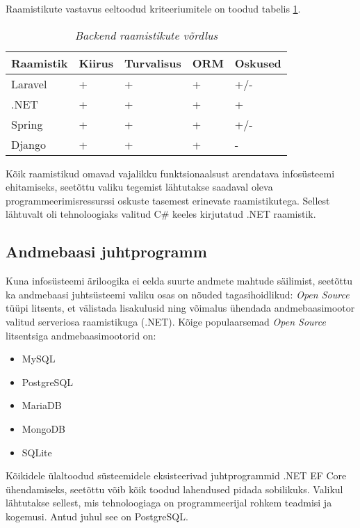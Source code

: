 Raamistikute vastavus eeltoodud kriteeriumitele on toodud tabelis \ref{tab:requirements}.
\begin{longtable}{|p{3cm}|p{2.5cm}|p{2.5cm}|p{2.5cm}|p{2.5cm}|}
	\caption{\it{Backend raamistikute võrdlus}}
	\label{tab:requirements}\\ \hline
	\textbf{Raamistik} &  \textbf{Kiirus} & \textbf{Turvalisus}  & \textbf{ORM} & \textbf{Oskused} \\
	\hline
	\endhead
	\endfoot
	\hline
	\endlastfoot
Laravel & + & + & + & +/-  \\ \hline
.NET    & + & + & + & +  \\ \hline
Spring  & + & + & + & +/-  \\ \hline
Django  & + & + & + & -  \\ \hline
\end{longtable}

Kõik raamistikud omavad vajalikku funktsionaalsust arendatava infosüsteemi ehitamiseks, seetõttu valiku tegemist 
lähtutakse saadaval oleva programmeerimisressurssi oskuste tasemest erinevate raamistikutega. Sellest lähtuvalt
oli tehnoloogiaks valitud C\# keeles kirjutatud .NET raamistik.

\subsection{Andmebaasi juhtprogramm}
\label{analysis_database_subsection}
Kuna infosüsteemi äriloogika ei eelda suurte andmete mahtude säilimist, seetõttu ka andmebaasi juhtsüsteemi 
valiku osas on nõuded tagasihoidlikud: \textit{Open Source} tüüpi litsents, et välistada lisakulusid ning
võimalus ühendada andmebaasimootor valitud serveriosa raamistikuga (.NET). Kõige populaarsemad 
\textit{Open Source} litsentsiga andmebaasimootorid on:
\begin{itemize}
    \item MySQL
    \item PostgreSQL
    \item MariaDB
    \item MongoDB
    \item SQLite
\end{itemize}
Kõikidele ülaltoodud süsteemidele eksisteerivad juhtprogrammid .NET EF Core ühendamiseks, seetõttu võib kõik
toodud lahendused pidada sobilikuks. Valikul lähtutakse sellest, mis tehnoloogiaga on programmeerijal  rohkem teadmisi 
ja kogemusi. Antud juhul see on PostgreSQL. 

